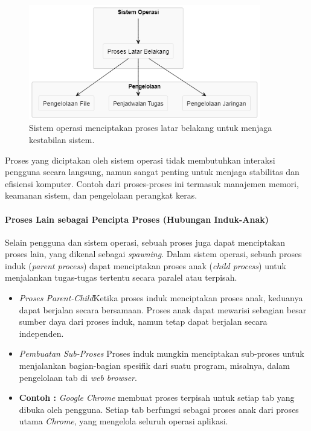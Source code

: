 \documentclass[12pt]{article}
\begin{document}
\begin{figure}[h]
    \centering
    \includegraphics[width=0.9\textwidth]{asset/os background process creation.png}
    \caption{Sistem operasi menciptakan proses latar belakang untuk menjaga kestabilan sistem.}
\end{figure}

Proses yang diciptakan oleh sistem operasi tidak membutuhkan interaksi pengguna secara langsung, namun sangat penting untuk menjaga stabilitas dan efisiensi komputer. Contoh dari proses-proses ini termasuk manajemen memori, keamanan sistem, dan pengelolaan perangkat keras.

\paragraph{Proses Lain sebagai Pencipta Proses (Hubungan Induk-Anak)}

Selain pengguna dan sistem operasi, sebuah proses juga dapat menciptakan proses lain, yang dikenal sebagai \textit{spawning}. Dalam sistem operasi, sebuah proses induk (\textit{parent process}) dapat menciptakan proses anak (\textit{child process}) untuk menjalankan tugas-tugas tertentu secara paralel atau terpisah.

\begin{itemize}
    \item \textit{Proses Parent-Child}Ketika proses induk menciptakan proses anak, keduanya dapat berjalan secara bersamaan. Proses anak dapat mewarisi sebagian besar sumber daya dari proses induk, namun tetap dapat berjalan secara independen.
    \item \textit{Pembuatan Sub-Proses} Proses induk mungkin menciptakan sub-proses untuk menjalankan bagian-bagian spesifik dari suatu program, misalnya, dalam pengelolaan tab di \textit{web browser}.
    \item \textbf{Contoh :} \textit{Google Chrome} membuat proses terpisah untuk setiap tab yang dibuka oleh pengguna. Setiap tab berfungsi sebagai proses anak dari proses utama \textit{Chrome}, yang mengelola seluruh operasi aplikasi.
\end{itemize}
\end{document}
